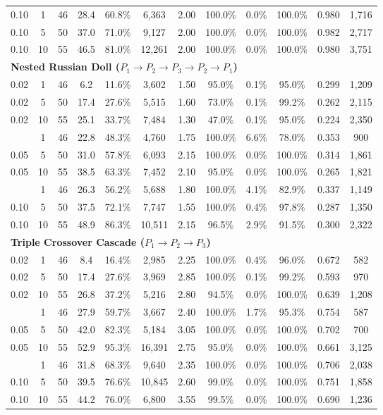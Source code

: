 \begin{table}[t]
\begin{tabular*}{\textwidth}{@{\extracolsep{\fill}} lccccccccccc}
0.10 &  1 & 46 & 28.4 & 60.8\% & 6,363 & 2.00 & 100.0\% &  0.0\% & 100.0\% & 0.980 & 1,716 \\
0.10 &  5 & 50 & 37.0 & 71.0\% & 9,127 & 2.00 & 100.0\% &  0.0\% & 100.0\% & 0.982 & 2,717 \\
0.10 & 10 & 55 & 46.5 & 81.0\% & 12,261 & 2.00 & 100.0\% &  0.0\% & 100.0\% & 0.980 & 3,751 \\
\midrule
\multicolumn{12}{l}{\textbf{Nested Russian Doll ($P_1 \to P_2 \to P_3 \to P_2 \to P_1$)}} \\
0.02 &  1 & 46 &  6.2 & 11.6\% & 3,602 & 1.50 & 95.0\% &  0.1\% & 95.0\% & 0.299 & 1,209 \\
0.02 &  5 & 50 & 17.4 & 27.6\% & 5,515 & 1.60 & 73.0\% &  0.1\% & 99.2\% & 0.262 & 2,115 \\
0.02 & 10 & 55 & 25.1 & 33.7\% & 7,484 & 1.30 & 47.0\% &  0.1\% & 95.0\% & 0.224 & 2,350 \\
\addlinespace
0.05 &  1 & 46 & 22.8 & 48.3\% & 4,760 & 1.75 & 100.0\% &  6.6\% & 78.0\% & 0.353 &  900 \\
0.05 &  5 & 50 & 31.0 & 57.8\% & 6,093 & 2.15 & 100.0\% &  0.0\% & 100.0\% & 0.314 & 1,861 \\
0.05 & 10 & 55 & 38.5 & 63.3\% & 7,452 & 2.10 & 95.0\% &  0.0\% & 100.0\% & 0.265 & 1,821 \\
\addlinespace
0.10 &  1 & 46 & 26.3 & 56.2\% & 5,688 & 1.80 & 100.0\% &  4.1\% & 82.9\% & 0.337 & 1,149 \\
0.10 &  5 & 50 & 37.5 & 72.1\% & 7,747 & 1.55 & 100.0\% &  0.4\% & 97.8\% & 0.287 & 1,350 \\
0.10 & 10 & 55 & 48.9 & 86.3\% & 10,511 & 2.15 & 96.5\% &  2.9\% & 91.5\% & 0.300 & 2,322 \\
\midrule
\multicolumn{12}{l}{\textbf{Triple Crossover Cascade ($P_1 \to P_2 \to P_3$)}} \\
0.02 &  1 & 46 &  8.4 & 16.4\% & 2,985 & 2.25 & 100.0\% &  0.4\% & 96.0\% & 0.672 &  582 \\
0.02 &  5 & 50 & 17.4 & 27.6\% & 3,969 & 2.85 & 100.0\% &  0.1\% & 99.2\% & 0.593 &  970 \\
0.02 & 10 & 55 & 26.8 & 37.2\% & 5,216 & 2.80 & 94.5\% &  0.0\% & 100.0\% & 0.639 & 1,208 \\
\addlinespace
0.05 &  1 & 46 & 27.9 & 59.7\% & 3,667 & 2.40 & 100.0\% &  1.7\% & 95.3\% & 0.754 &  587 \\
0.05 &  5 & 50 & 42.0 & 82.3\% & 5,184 & 3.05 & 100.0\% &  0.0\% & 100.0\% & 0.702 &  700 \\
0.05 & 10 & 55 & 52.9 & 95.3\% & 16,391 & 2.75 & 95.0\% &  0.0\% & 100.0\% & 0.661 & 3,125 \\
\addlinespace
0.10 &  1 & 46 & 31.8 & 68.3\% & 9,640 & 2.35 & 100.0\% &  0.0\% & 100.0\% & 0.706 & 2,038 \\
0.10 &  5 & 50 & 39.5 & 76.6\% & 10,845 & 2.60 & 99.0\% &  0.0\% & 100.0\% & 0.751 & 1,858 \\
0.10 & 10 & 55 & 44.2 & 76.0\% & 6,800 & 3.55 & 99.5\% &  0.0\% & 100.0\% & 0.690 & 1,236 \\
\bottomrule
\end{tabular*}
\end{table}

